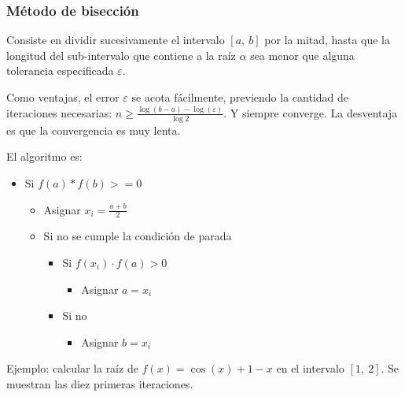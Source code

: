 \documentclass{article}
\begin{document}
\subsubsection{Método de bisección}


Consiste en dividir sucesivamente el intervalo $[a,\ b]$ por la mitad, hasta que
la longitud del sub-intervalo que contiene a la raíz $\alpha$ sea menor que 
alguna tolerancia especificada $\varepsilon$.

Como ventajas, el error $\varepsilon$ se acota fácilmente, previendo la cantidad
de iteraciones necesarias: $n\geq\frac{\log(b-a)-\log(\varepsilon)}{\log 2}$. Y 
siempre converge. La desventaja es que la convergencia es muy lenta.

El algoritmo es:

\begin{itemize}
    \item Si $f(a)*f(b) >= 0$
    \begin{itemize}
        \item Asignar $x_i = \frac{a+b}{2}$
        \item Si no se cumple la condición de parada
        \begin{itemize}
            \item Si $f(x_i)\cdot f(a) > 0$
            \begin{itemize}
                \item Asignar $a = x_i$
            \end{itemize}
            \item Si no
            \begin{itemize}
                \item Asignar $b = x_i$
            \end{itemize}
        \end{itemize}
    \end{itemize}
\end{itemize}

Ejemplo: calcular la raíz de $f(x) = \cos(x) + 1 - x$ en el intervalo $[1,\ 2]$.
Se muestran las diez primeras iteraciones.
\end{document}
